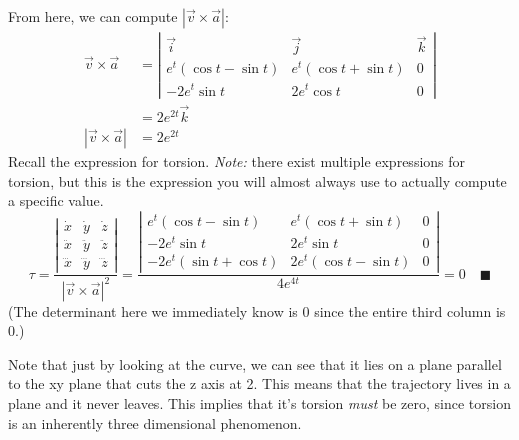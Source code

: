 \documentclass[letterpaper, 11pt]{article}
\begin{document}
\begin{enumerate}
From here, we can compute $|\vec v \times \vec a|$:
\begin{align*}
\vec v \times \vec a &= \left| \begin{array}{ccc} \vec i & \vec j & \vec k \\
e^t(\cos t - \sin t) & e^t (\cos t + \sin t) & 0 \\
-2e^t \sin t & 2e^t \cos t & 0 \end{array} \right|\\
&= 2e^{2t} \vec k \\
|\vec v \times \vec a | &= 2 e^{2t}
\end{align*}
Recall the expression for torsion. \textit{Note:} there exist multiple expressions for torsion, but this is the expression you will almost always use to actually compute a specific value.
\[ \tau = \frac{ \left| \begin{array}{ccc} \dot x & \dot y & \dot z \\
\ddot x & \ddot y & \ddot z  \\ \dddot x &\dddot y &\dddot z \end{array} \right| }{ |\vec v \times \vec a|^2} = 
\frac{ \left| \begin{array}{ccc} e^t(\cos t - \sin t) & e^t(\cos t + \sin t) & 0 \\
-2e^t \sin t & 2e^t \sin t & 0  \\ -2e^t(\sin t + \cos t) &2e^t(\cos t - \sin t) & 0  \end{array} \right| }{ 4e^{4t}}
= 0 \quad\blacksquare\]
(The determinant here we immediately know is 0 since the entire third column is 0.) 
\par Note that just by looking at the curve, we can see that it lies on a plane parallel to the xy plane that cuts the z axis at 2. This means that the trajectory lives in a plane and it never leaves. This implies that it's torsion \textit{must} be zero, since torsion is an inherently three dimensional phenomenon.

\end{enumerate}
\end{document}
